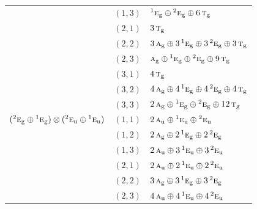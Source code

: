 \documentclass[11pt]{article}
\newcommand{\irr}[1]{\text{\normalfont\scshape #1}}
\newcommand{\conjpair}[1]{{}^{#1}}
\newcommand{\ptag}[1]{\mathrm{#1}}
\begin{document}
\begin{longtable}{p{} c p{}}
 & $(1,3)$ & $\conjpair{1}\irr{e}_{\ptag{g}}\oplus \conjpair{2}\irr{e}_{\ptag{g}}\oplus 6\,\irr{t}_{\ptag{g}}$\\

 & $(2,1)$ & $3\,\irr{t}_{\ptag{g}}$\\

 & $(2,2)$ & $3\,\irr{a}_{\ptag{g}}\oplus 3\,\conjpair{1}\irr{e}_{\ptag{g}}\oplus 3\,\conjpair{2}\irr{e}_{\ptag{g}}\oplus 3\,\irr{t}_{\ptag{g}}$\\

 & $(2,3)$ & $\irr{a}_{\ptag{g}}\oplus \conjpair{1}\irr{e}_{\ptag{g}}\oplus \conjpair{2}\irr{e}_{\ptag{g}}\oplus 9\,\irr{t}_{\ptag{g}}$\\

 & $(3,1)$ & $4\,\irr{t}_{\ptag{g}}$\\

 & $(3,2)$ & $4\,\irr{a}_{\ptag{g}}\oplus 4\,\conjpair{1}\irr{e}_{\ptag{g}}\oplus 4\,\conjpair{2}\irr{e}_{\ptag{g}}\oplus 4\,\irr{t}_{\ptag{g}}$\\

 & $(3,3)$ & $2\,\irr{a}_{\ptag{g}}\oplus \conjpair{1}\irr{e}_{\ptag{g}}\oplus \conjpair{2}\irr{e}_{\ptag{g}}\oplus 12\,\irr{t}_{\ptag{g}}$\\

\hline

$(\conjpair{2}\irr{e}_{\ptag{g}}\oplus \conjpair{1}\irr{e}_{\ptag{g}})\otimes (\conjpair{2}\irr{e}_{\ptag{u}}\oplus \conjpair{1}\irr{e}_{\ptag{u}})$ & $(1,1)$ & $2\,\irr{a}_{\ptag{u}}\oplus \conjpair{1}\irr{e}_{\ptag{u}}\oplus \conjpair{2}\irr{e}_{\ptag{u}}$\\

 & $(1,2)$ & $2\,\irr{a}_{\ptag{g}}\oplus 2\,\conjpair{1}\irr{e}_{\ptag{g}}\oplus 2\,\conjpair{2}\irr{e}_{\ptag{g}}$\\

 & $(1,3)$ & $2\,\irr{a}_{\ptag{u}}\oplus 3\,\conjpair{1}\irr{e}_{\ptag{u}}\oplus 3\,\conjpair{2}\irr{e}_{\ptag{u}}$\\

 & $(2,1)$ & $2\,\irr{a}_{\ptag{u}}\oplus 2\,\conjpair{1}\irr{e}_{\ptag{u}}\oplus 2\,\conjpair{2}\irr{e}_{\ptag{u}}$\\

 & $(2,2)$ & $3\,\irr{a}_{\ptag{g}}\oplus 3\,\conjpair{1}\irr{e}_{\ptag{g}}\oplus 3\,\conjpair{2}\irr{e}_{\ptag{g}}$\\

 & $(2,3)$ & $4\,\irr{a}_{\ptag{u}}\oplus 4\,\conjpair{1}\irr{e}_{\ptag{u}}\oplus 4\,\conjpair{2}\irr{e}_{\ptag{u}}$\\


\end{longtable}
\end{document}
